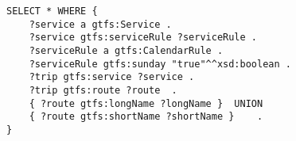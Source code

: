 \begin{lstlisting}[caption={Query 18 - All routes that have trips on Sunday}, label=lst:sparql18, basicstyle=\ttfamily,frame=single]
SELECT * WHERE {
	?service a gtfs:Service .
	?service gtfs:serviceRule ?serviceRule .
	?serviceRule a gtfs:CalendarRule .
	?serviceRule gtfs:sunday "true"^^xsd:boolean . 
	?trip gtfs:service ?service .
	?trip gtfs:route ?route  .
	{ ?route gtfs:longName ?longName }  UNION
	{ ?route gtfs:shortName ?shortName } 	.
}
\end{lstlisting}

